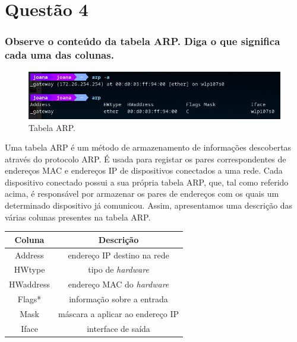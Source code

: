 

\section{Questão 4}

\subsubsection{Observe o conteúdo da tabela ARP. Diga o que significa cada uma das colunas.}

    \begin{figure}[H]
    \centering
    \includegraphics[width=350pt]{prints/Questao4/questao4-ArpTABLE.png}
    \caption{Tabela ARP.} \label{questao4-ARPRequest1}
    \end{figure}
    
    \par Uma tabela ARP é um método de armazenamento de informações descobertas através do protocolo ARP. É usada para registar os pares correspondentes de endereços MAC e endereços IP de dispositivos conectados a uma rede. Cada dispositivo conectado possui a sua própria tabela ARP, que, tal como referido acima, é responsável por armazenar os pares de endereços com os quais um determinado dispositivo já comunicou. Assim, apresentamos uma descrição das várias colunas presentes na tabela ARP.
    
    \begin{center}
        \begin{tabular}{|c|c|}
        \hline
            \cline{1-2}
            Coluna & Descrição  \\
            \hline \hline
            Address & endereço IP destino na rede\\
            HWtype & tipo de \textit{hardware} \\
            HWaddress & endereço MAC do \textit{hardware}\\
            Flags* & informação sobre a entrada \\
            Mask & máscara a aplicar ao endereço IP \\
            Iface & interface de saída \\
            \cline{1-2}
        \end{tabular}
    \end{center}
    
